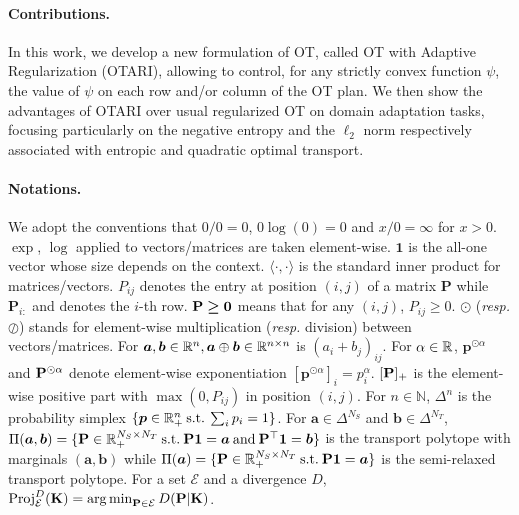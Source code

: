 \paragraph{Contributions.} In this work, we develop a new formulation of OT, called OT with Adaptive Regularization (OTARI), allowing to control, for any strictly convex function $\psi$, the value of $\psi$ on each row and/or column of the OT plan. 
We then show the advantages of OTARI over usual regularized OT on domain adaptation tasks, focusing particularly on the negative entropy and the $\ell_2$ norm respectively associated with entropic \cite{cuturi2013sinkhorn} and quadratic \cite{blondel2018smooth} optimal transport.

\paragraph{Notations.}
We adopt the conventions that $0/0 = 0$, $0 \log(0) = 0$ and $x/0 = \infty$ for $x > 0$.
$\exp$, $\log$ applied to vectors/matrices are taken element-wise.  
$\bm{1}$ is the all-one vector whose size depends on the context.
$\langle \cdot, \cdot \rangle$ is the standard inner product for matrices/vectors. 
$P_{ij}$ denotes the entry at position $(i,j)$ of a matrix $\mathbf{P}$ while $\mathbf{P}_{i:}$ and denotes the $i$-th row. 
${\mathbf{P}} \bm{\geq} \bm{0}$ means that for any $(i,j)$, $P_{ij} \geq 0$.
$\odot$ (\textit{resp.} $\oslash$) stands for element-wise multiplication (\textit{resp.} division) between vectors/matrices. 
For $\bm{a}, \bm{b} \in \mathbb{R}^n, \bm{a} \oplus \bm{b} \in \mathbb{R}^{n \times n}$ is $(a_i + b_j)_{ij}$.
For $\alpha \in \mathbb{R}$, $\bm{p}^{\odot \alpha}$ and ${\mathbf{P}}^{\odot \alpha}$ denote element-wise exponentiation \ie $[\bm{p}^{\odot \alpha}]_i = p_i^\alpha$.
$[{\mathbf{P}}]_+$ is the element-wise positive part with $\max(0,P_{ij})$ in position $(i,j)$.
For $n \in \mathbb{N}$, $\Delta^{n}$ is the probability simplex $\{ \bm{p} \in \mathbb{R}_+^n \: \text{s.t.} \: \sum_i p_i = 1 \}$.
For $\bm{a} \in \Delta^{N_S}$ and $\bm{b} \in \Delta^{N_T}$, $\Pi(\bm{a}, \bm{b}) = \{ {\mathbf{P}} \in \mathbb{R}_+^{N_S \times N_T} \: \text{s.t.} \: {\mathbf{P}} \bm{1} = \bm{a} \: \text{and} \: {\mathbf{P}}^\top \bm{1} = \bm{b} \}$ is the transport polytope with marginals $(\bm{a}, \bm{b})$ while $\Pi(\bm{a}) = \{ {\mathbf{P}} \in \mathbb{R}_+^{N_S \times N_T} \: \text{s.t.} \: {\mathbf{P}} \bm{1} = \bm{a} \}$ is the semi-relaxed transport polytope.
For a set $\mathcal{E}$ and a divergence $D$, $\operatorname{Proj}^{D}_{\mathcal{E}}({\mathbf{K}})  =  \operatorname*{arg\,min}_{{\mathbf{P}} \in\mathcal{E}} D({\mathbf{P}} | {\mathbf{K}})$.